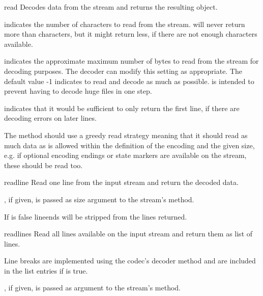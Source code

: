 \begin{methoddesc}{read}{}
  Decodes data from the stream and returns the resulting object.

   indicates the number of characters to read from the
  stream.  will never return more than 
  characters, but it might return less, if there are not enough
  characters available.

   indicates the approximate maximum number of bytes to read
  from the stream for decoding purposes. The decoder can modify this
  setting as appropriate. The default value -1 indicates to read and
  decode as much as possible.   is intended to prevent having
  to decode huge files in one step.

   indicates that it would be sufficient to only return
  the first line, if there are decoding errors on later lines.

  The method should use a greedy read strategy meaning that it should
  read as much data as is allowed within the definition of the encoding
  and the given size, e.g.  if optional encoding endings or state
  markers are available on the stream, these should be read too.

\end{methoddesc}

\begin{methoddesc}{readline}{}
  Read one line from the input stream and return the
  decoded data.

  , if given, is passed as size argument to the stream's
   method.

  If  is false lineends will be stripped from the
  lines returned.

\end{methoddesc}

\begin{methoddesc}{readlines}{}
  Read all lines available on the input stream and return them as list
  of lines.

  Line breaks are implemented using the codec's decoder method and are
  included in the list entries if  is true.

  , if given, is passed as  argument to the
  stream's  method.
\end{methoddesc}


